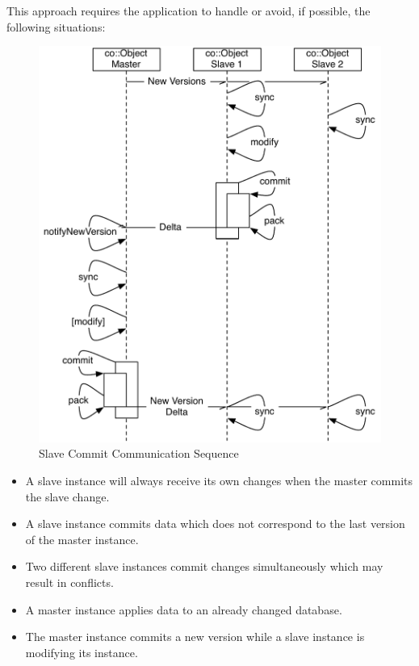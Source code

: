 \documentclass[10pt,a4]{scrartcl}
\begin{document}
This approach requires the application to handle or avoid, if possible, the
following situations:
\begin{figure}
  \vspace{-2ex}\includegraphics[width=.618\textwidth]{images/slaveWrites.pdf}
  {\caption{\label{fSlaveCommit}Slave Commit Communication Sequence}}
  \vspace{-10ex}
\end{figure}
\begin{itemize}
\item A slave instance will always receive its own changes when the master
  commits the slave change.
\item A slave instance commits data which does not correspond to the last
  version of the master instance.
\item Two different slave instances commit changes simultaneously which may
  result in conflicts.
\item A master instance applies data to an already changed database.
\item The master instance commits a new version while a slave instance is
  modifying its instance. 
\end{itemize}
\end{document}
